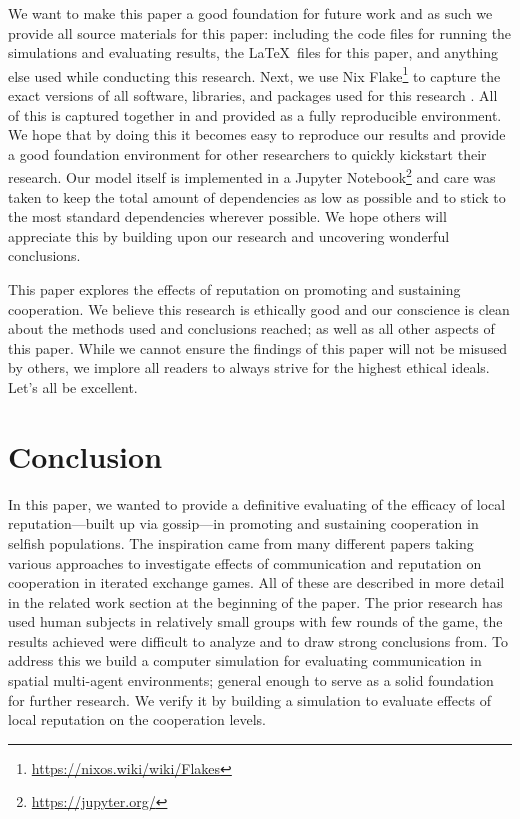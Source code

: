 \documentclass[english]{article}
\begin{document}
We want to make this paper a good foundation for future work and as such we provide all source materials for this paper: including the code files for running the simulations and evaluating results, the \LaTeX\ files for this paper, and anything else used while conducting this research.
Next, we use Nix Flake\footnote{\url{https://nixos.wiki/wiki/Flakes}} to capture the exact versions of all software, libraries, and packages used for this research \citep{nix}. All of this is captured together in and provided as a fully reproducible environment.
We hope that by doing this it becomes easy to reproduce our results and provide a good foundation environment for other researchers to quickly kickstart their research.
Our model itself is implemented in a Jupyter Notebook\footnote{\url{https://jupyter.org/}} and care was taken to keep the total amount of dependencies as low as possible and to stick to the most standard dependencies wherever possible.
We hope others will appreciate this by building upon our research and uncovering wonderful conclusions.

This paper explores the effects of reputation on promoting and sustaining cooperation.
We believe this research is ethically good and our conscience is clean about the methods used and conclusions reached; as well as all other aspects of this paper.
While we cannot ensure the findings of this paper will not be misused by others, we implore all readers to always strive for the highest ethical ideals.
Let's all be excellent.




\section{Conclusion}
In this paper, we wanted to provide a definitive evaluating of the efficacy of local reputation---built up via gossip---in promoting and sustaining cooperation in selfish populations.
The inspiration came from many different papers taking various approaches to investigate effects of communication and reputation on cooperation in iterated exchange games.
All of these are described in more detail in the related work section at the beginning of the paper.
The prior research has used human subjects in relatively small groups with few rounds of the game, the results achieved were difficult to analyze and to draw strong conclusions from.
To address this we build a computer simulation for evaluating communication in spatial multi-agent environments; general enough to serve as a solid foundation for further research.
We verify it by building a simulation to evaluate effects of local reputation on the cooperation levels.
\end{document}
